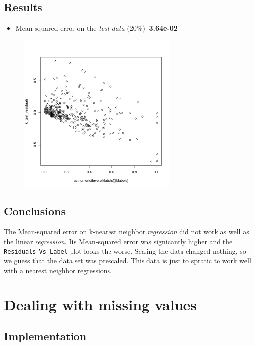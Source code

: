 \documentclass[12pt,a4paper]{article}
\begin{document}
\begin{singlespace}
\subsection{Results}
\begin{itemize}
    \item Mean-squared error on the \emph{test data} (20\%): \textbf{3.64e-02}
\end{itemize}

\vspace{-0.5cm}
\begin{figure}[h!]
    \centering
    \includegraphics[width=0.7\textwidth,trim= 0 0 20 30, clip]{NN_regression_residuals.pdf}
\end{figure}
\FloatBarrier


\subsection{Conclusions}


The Mean-squared error on k-nearest neighbor \emph{regression} did not work as well as the linear \emph{regression}. Its Mean-squared error was signicantly higher and the \texttt{Residuals Vs Label} plot looks the worse. Scaling the data changed nothing, so we guess that the data set was prescaled. This data is just to spratic to work well with a nearest neighbor regressions.

\newpage
\section{Dealing with missing values}
\subsection{Implementation}


\end{singlespace}
\end{document}
